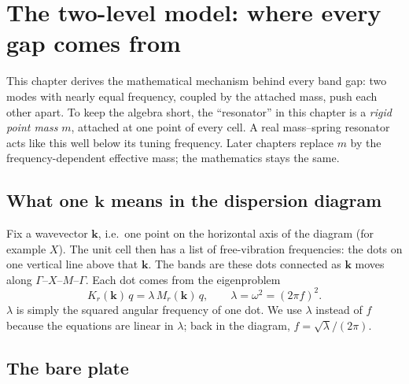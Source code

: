 
\chapter{The two-level model: where every gap comes from}
\label{ch:two_level}

This chapter derives the mathematical mechanism behind every band gap: two
modes with nearly equal frequency, coupled by the attached mass, push each
other apart. To keep the algebra short, the ``resonator'' in this chapter is a
\emph{rigid point mass} $m$, attached at one point of every cell. A real
mass--spring resonator acts like this well below its tuning frequency. Later
chapters replace $m$ by the frequency-dependent effective mass; the
mathematics stays the same.

\section{What one $\mathbf{k}$ means in the dispersion diagram}

Fix a wavevector $\mathbf{k}$, i.e.\ one point on the horizontal axis of the
diagram (for example $X$). The unit cell then has a list of free-vibration
frequencies: the dots on one vertical line above that $\mathbf{k}$. The bands
are these dots connected as $\mathbf{k}$ moves along
$\Gamma$--$X$--$M$--$\Gamma$. Each dot comes from the eigenproblem
\begin{equation}
  K_r(\mathbf{k})\, q = \lambda\, M_r(\mathbf{k})\, q,
  \qquad \lambda = \omega^2 = (2\pi f)^2 .
\end{equation}
$\lambda$ is simply the squared angular frequency of one dot. We use $\lambda$
instead of $f$ because the equations are linear in $\lambda$; back in the
diagram, $f = \sqrt{\lambda}/(2\pi)$.

\section{The bare plate}

